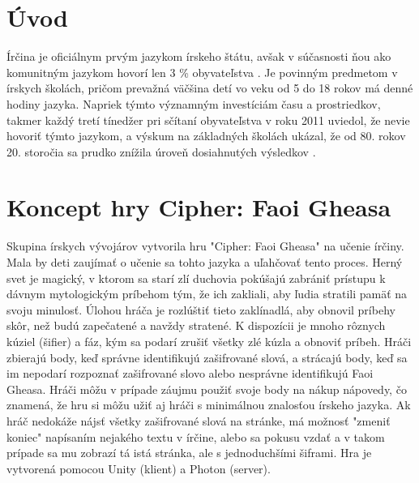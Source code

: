 \documentclass[10pt,twoside,slovak,a4paper]{article}
\begin{document}
\section{Úvod}

\qquad Írčina je oficiálnym prvým jazykom írskeho štátu, avšak v súčasnosti ňou ako komunitným jazykom hovorí len 3 \% obyvateľstva \cite{BibEntry2020Oct}. Je povinným predmetom v írskych školách, pričom prevažná väčšina detí vo veku od 5 do 18 rokov má denné hodiny jazyka. Napriek týmto významným investíciám
času a prostriedkov, takmer každý tretí tínedžer pri sčítaní obyvateľstva v roku 2011 uviedol, že nevie hovoriť týmto jazykom, a výskum na základných školách ukázal, že od 80. rokov 20. storočia sa prudko znížila úroveň dosiahnutých výsledkov \cite{BibEntry2019Aug}. \\

\section{Koncept hry Cipher: Faoi Gheasa}
\qquad Skupina írskych vývojárov vytvorila hru "Cipher: Faoi Gheasa" na učenie írčiny. Mala by deti zaujímať o učenie sa tohto jazyka a uľahčovať tento proces. Herný svet je magický, v ktorom sa starí zlí duchovia pokúšajú zabrániť prístupu k dávnym mytologickým príbehom tým, že ich zakliali, aby ľudia stratili pamäť na svoju minulosť. Úlohou hráča je rozlúštiť tieto zaklínadlá, aby obnovil príbehy skôr, než budú zapečatené a navždy stratené. K dispozícii je mnoho rôznych kúziel (šifier) a fáz, kým sa podarí zrušiť všetky zlé kúzla a obnoviť príbeh. Hráči zbierajú body, keď správne identifikujú zašifrované slová, a strácajú body, keď sa im nepodarí rozpoznať zašifrované slovo alebo nesprávne identifikujú Faoi Gheasa. Hráči môžu v prípade záujmu použiť svoje body na nákup nápovedy, čo znamená, že hru si môžu užiť aj hráči s minimálnou znalosťou írskeho jazyka. Ak hráč nedokáže nájsť všetky zašifrované slová na stránke, má možnosť "zmeniť koniec" napísaním nejakého textu v írčine, alebo sa pokusu vzdať a v takom prípade sa mu zobrazí tá istá stránka, ale s jednoduchšími šiframi. Hra je vytvorená pomocou Unity (klient) a Photon (server).\cite{Xu2022Jun}\\
\end{document}

